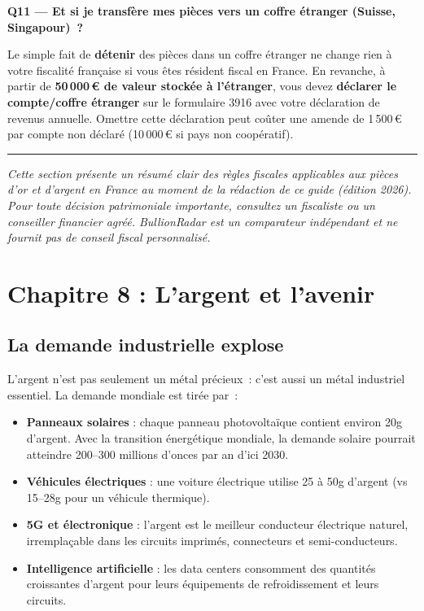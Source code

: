 \documentclass[14pt,a4paper]{extarticle}
\begin{document}
\textbf{Q11 --- Et si je transfère mes pièces vers un coffre étranger (Suisse, Singapour)~?}

Le simple fait de \textbf{détenir} des pièces dans un coffre étranger ne change rien à votre fiscalité française si vous êtes résident fiscal en France. En revanche, à partir de \textbf{50\,000\,€ de valeur stockée à l'étranger}, vous devez \textbf{déclarer le compte/coffre étranger} sur le formulaire 3916 avec votre déclaration de revenus annuelle. Omettre cette déclaration peut coûter une amende de 1\,500\,€ par compte non déclaré (10\,000\,€ si pays non coopératif).

\medskip

\hrule

\medskip

\textit{Cette section présente un résumé clair des règles fiscales applicables aux pièces d'or et d'argent en France au moment de la rédaction de ce guide (édition 2026). Pour toute décision patrimoniale importante, consultez un fiscaliste ou un conseiller financier agréé. BullionRadar est un comparateur indépendant et ne fournit pas de conseil fiscal personnalisé.}

\newpage

\section{Chapitre 8 : L'argent et l'avenir}

\subsection{La demande industrielle explose}

L'argent n'est pas seulement un métal précieux~: c'est aussi un métal industriel essentiel. La demande mondiale est tirée par~:

\begin{itemize}
  \item \textbf{Panneaux solaires} : chaque panneau photovoltaïque contient environ 20g d'argent. Avec la transition énergétique mondiale, la demande solaire pourrait atteindre 200--300 millions d'onces par an d'ici 2030.
  \item \textbf{Véhicules électriques} : une voiture électrique utilise 25 à 50g d'argent (vs 15--28g pour un véhicule thermique).
  \item \textbf{5G et électronique} : l'argent est le meilleur conducteur électrique naturel, irremplaçable dans les circuits imprimés, connecteurs et semi-conducteurs.
  \item \textbf{Intelligence artificielle} : les data centers consomment des quantités croissantes d'argent pour leurs équipements de refroidissement et leurs circuits.
\end{itemize}
\end{document}
